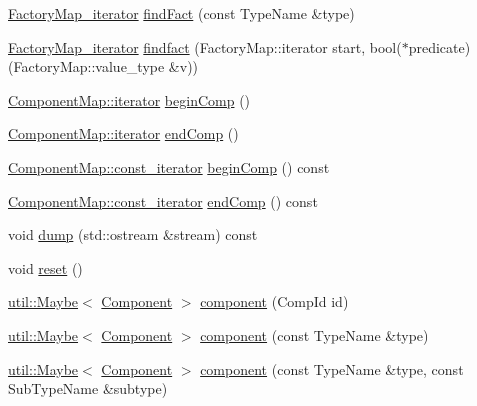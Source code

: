 \begin{DoxyCompactItemize}
\hyperlink{classtheoria_1_1core_1_1Registry_ae131721f32d396fad4d2d48b0438dca1}{Factory\+Map\+\_\+iterator} \hyperlink{classtheoria_1_1core_1_1Registry_a54ee3016a6f14b3bedfecd3566caf0b5}{find\+Fact} (const Type\+Name \&type)
\item 
\hyperlink{classtheoria_1_1core_1_1Registry_ae131721f32d396fad4d2d48b0438dca1}{Factory\+Map\+\_\+iterator} \hyperlink{classtheoria_1_1core_1_1Registry_a044928d257bed09b8c288c41e5c95a26}{findfact} (Factory\+Map\+::iterator start, bool($\ast$predicate)(Factory\+Map\+::value\+\_\+type \&v))
\item 
\hyperlink{classtheoria_1_1util_1_1densemap_a4ee170442110252d3033534246f9677f}{Component\+Map\+::iterator} \hyperlink{classtheoria_1_1core_1_1Registry_a18f0cf6b2c11daeac894231aabc2d6c3}{begin\+Comp} ()
\item 
\hyperlink{classtheoria_1_1util_1_1densemap_a4ee170442110252d3033534246f9677f}{Component\+Map\+::iterator} \hyperlink{classtheoria_1_1core_1_1Registry_a66ed200d29e49b9eb762a29f580c102a}{end\+Comp} ()
\item 
\hyperlink{classtheoria_1_1util_1_1densemap_a8c2937f8e4ba47abf344d9f9f23f0c88}{Component\+Map\+::const\+\_\+iterator} \hyperlink{classtheoria_1_1core_1_1Registry_a82497b1f2b7bf529b15633dfaf9bd1e6}{begin\+Comp} () const
\item 
\hyperlink{classtheoria_1_1util_1_1densemap_a8c2937f8e4ba47abf344d9f9f23f0c88}{Component\+Map\+::const\+\_\+iterator} \hyperlink{classtheoria_1_1core_1_1Registry_a27b24a7a567677cb23aef0d3510b0a20}{end\+Comp} () const
\item 
void \hyperlink{classtheoria_1_1core_1_1Registry_a1c4d191d20916e4821bee32680a804e6}{dump} (std\+::ostream \&stream) const
\item 
void \hyperlink{classtheoria_1_1core_1_1Registry_af66ab76f6173d7e7c99a0c47dc2bfd70}{reset} ()
\item 
\hyperlink{classtheoria_1_1util_1_1Maybe}{util\+::\+Maybe}$<$ \hyperlink{classtheoria_1_1core_1_1Component}{Component} $>$ \hyperlink{classtheoria_1_1core_1_1Registry_a33f5edc42d5a194a7682bf0bf20cbf52}{component} (Comp\+Id id)
\item 
\hyperlink{classtheoria_1_1util_1_1Maybe}{util\+::\+Maybe}$<$ \hyperlink{classtheoria_1_1core_1_1Component}{Component} $>$ \hyperlink{classtheoria_1_1core_1_1Registry_a7daaf0e52575c5dfbdb33c81953142f5}{component} (const Type\+Name \&type)
\item 
\hyperlink{classtheoria_1_1util_1_1Maybe}{util\+::\+Maybe}$<$ \hyperlink{classtheoria_1_1core_1_1Component}{Component} $>$ \hyperlink{classtheoria_1_1core_1_1Registry_a5a3cafd6ebd46a88fb5afb877a4b04ad}{component} (const Type\+Name \&type, const Sub\+Type\+Name \&subtype)

\end{DoxyCompactItemize}
